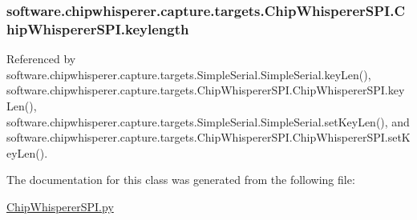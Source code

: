 \hypertarget{classsoftware_1_1chipwhisperer_1_1capture_1_1targets_1_1ChipWhispererSPI_1_1ChipWhispererSPI_a1c76a1307e486eb4dbe07a4b4d293410}{}
\subsubsection[{keylength}]{\setlength{\rightskip}{0pt plus 5cm}software.\+chipwhisperer.\+capture.\+targets.\+Chip\+Whisperer\+S\+P\+I.\+Chip\+Whisperer\+S\+P\+I.\+keylength}\label{classsoftware_1_1chipwhisperer_1_1capture_1_1targets_1_1ChipWhispererSPI_1_1ChipWhispererSPI_a1c76a1307e486eb4dbe07a4b4d293410}


Referenced by software.\+chipwhisperer.\+capture.\+targets.\+Simple\+Serial.\+Simple\+Serial.\+key\+Len(), software.\+chipwhisperer.\+capture.\+targets.\+Chip\+Whisperer\+S\+P\+I.\+Chip\+Whisperer\+S\+P\+I.\+key\+Len(), software.\+chipwhisperer.\+capture.\+targets.\+Simple\+Serial.\+Simple\+Serial.\+set\+Key\+Len(), and software.\+chipwhisperer.\+capture.\+targets.\+Chip\+Whisperer\+S\+P\+I.\+Chip\+Whisperer\+S\+P\+I.\+set\+Key\+Len().



The documentation for this class was generated from the following file\+:\begin{DoxyCompactItemize}
\item 
\hyperlink{ChipWhispererSPI_8py}{Chip\+Whisperer\+S\+P\+I.\+py}\end{DoxyCompactItemize}
